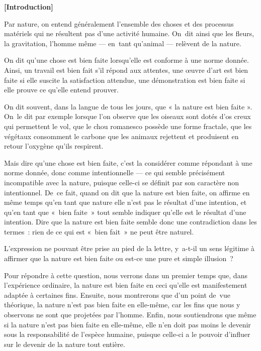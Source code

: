 \documentclass[a4paper,12pt]{report}
\begin{document}
\textbf{[Introduction]}

Par nature, on entend généralement l'ensemble des
choses et des processus matériels qui ne résultent pas d'une activité
humaine. On dit ainsi que les fleurs, la gravitation, l'homme même —
en tant qu'animal — relèvent de la nature.

On dit qu'une chose est bien faite lorsqu'elle est conforme à une norme
donnée. Ainsi, un travail est bien fait s'il répond aux attentes, une
œuvre d'art est bien faite si elle suscite la satisfaction attendue, une
démonstration est bien faite si elle prouve ce qu'elle entend prouver.

On dit souvent, dans la langue de tous les
jours, que « la nature est bien faite ». On le dit par exemple lorsque
l'on observe que les oiseaux sont dotés d'os creux qui permettent le
vol, que le chou romanesco possède une forme fractale, que les végétaux
consomment le carbone que les animaux rejettent et produisent en retour
l'oxygène qu'ils respirent.

Mais dire qu'une chose est bien faite, c'est la
considérer comme répondant à une norme donnée, donc comme intentionnelle
— ce qui semble précisément incompatible avec la nature, puisque
celle-ci se définit par son caractère non intentionnel. De ce fait,
quand on dit que la nature est bien faite, on affirme en même temps
qu'en tant que nature elle n'est pas le résultat d'une intention, et
qu'en tant que « bien faite » tout semble indiquer qu'elle est le
résultat d'une intention. Dire que la nature est bien faite semble donc
une contradiction dans les termes : rien de ce qui est « bien fait » ne
peut être naturel.

L'expression ne pouvant être prise au pied de
la lettre, y a-t-il un sens légitime à affirmer que la nature est bien
faite ou est-ce une pure et simple illusion ?

Pour répondre à cette question, nous verrons dans un
premier temps que, dans l'expérience ordinaire, la nature est bien faite
en ceci qu'elle est manifestement adaptée à certaines fins. Ensuite,
nous montrerons que d'un point de vue théorique, la nature n'est pas
bien faite en elle-même, car les fins que nous y observons ne sont que
projetées par l'homme. Enfin, nous soutiendrons que même si la nature
n'est pas bien faite en elle-même, elle n'en doit pas moins le devenir
sous la responsabilité de l'espèce humaine, puisque celle-ci a le
pouvoir d'influer sur le devenir de la nature tout entière.
\end{document}
